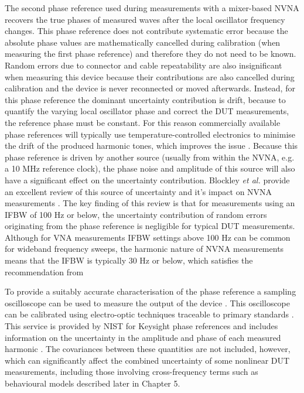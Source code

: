 \documentclass[../thesis/thesis.tex]{subfiles}
\begin{document}
\begin{refsection}
The second phase reference used during measurements with a mixer-based NVNA recovers the true phases of measured waves after the local oscillator frequency changes. This phase reference does not contribute systematic error because the absolute phase values are mathematically cancelled during calibration (when measuring the first phase reference) and therefore they do not need to be known. Random errors due to connector and cable repeatability are also insignificant when measuring this device because their contributions are also cancelled during calibration and the device is never reconnected or moved afterwards. Instead, for this phase reference the dominant uncertainty contribution is drift, because to quantify the varying local oscillator phase and correct the DUT measurements, the reference phase must be constant. For this reason commercially available phase references will typically use temperature-controlled electronics to minimise the drift of the produced harmonic tones, which improves the issue \cite{Jargon_2003}. Because this phase reference is driven by another source (usually from within the NVNA, e.g. a 10 MHz reference clock), the phase noise and amplitude of this source will also have a significant effect on the uncertainty contribution. Blockley \emph{et al.} provide an excellent review of this source of uncertainty and it's impact on NVNA measurements \cite{Blockley_2007}. The key finding of this review is that for measurements using an IFBW of 100 Hz or below, the uncertainty contribution of random errors originating from the phase reference is negligible for typical DUT measurements. Although for VNA measurements IFBW settings above 100 Hz can be common for wideband frequency sweeps, the harmonic nature of NVNA measurements means that the IFBW is typically 30 Hz or below, which satisfies the recommendation from \cite{Blockley_2007}

To provide a suitably accurate characterisation of the phase reference a sampling oscilloscope can be used to measure the output of the device \cite{Reader_2008}. This oscilloscope can be calibrated using electro-optic techniques traceable to primary standards \cite{Williams_2006, Hale_2009}. This service is provided by NIST for Keysight phase references and includes information on the uncertainty in the amplitude and phase of each measured harmonic \cite{Keysight_2017}. The covariances between these quantities are not included, however, which can significantly affect the combined uncertainty of some nonlinear DUT measurements, including those involving cross-frequency terms such as behavioural models described later in Chapter 5.


\end{refsection}
\end{document}
